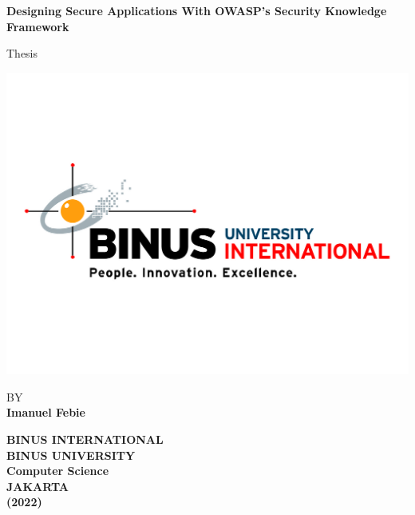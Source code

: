 \begin{titlepage}

    \begin{center}
        \vspace*{1cm}

        \Large
        \textbf{Designing Secure Applications With OWASP's Security Knowledge Framework}
        
        \vspace{1cm}

        \large
        Thesis

        \vspace{0.2cm}

        \includegraphics[width=\textwidth]{img/binus-inter-logo.jpg}

        \vspace{0.1cm}
        
        \normalsize
        BY \\
        \textbf{Imanuel Febie}\\
        \large

        \vspace{2cm}

        \normalsize
        \textbf{BINUS INTERNATIONAL \\
        BINUS UNIVERSITY  \\
        Computer Science \\
        JAKARTA \\
        (2022)}

    \end{center}

\end{titlepage}
